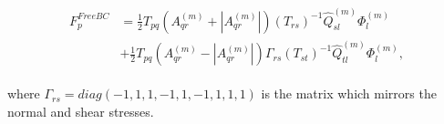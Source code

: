 \begin{align}
    \begin{split}
    F_{p}^{FreeBC} &= \frac{1}{2}T_{pq}\left(A_{qr}^{\left(m\right)} + \left|A_{qr}^{\left(m\right)}\right|\right) \left(T_{rs}\right)^{-1} \hat{Q}_{sl}^{\left(m\right)} \Phi_l^{\left(m\right)}
    \\ &+ \frac{1}{2} T_{pq} \left(A_{qr}^{\left(m\right)} - \left|A_{qr}^{\left(m\right)}\right|\right) \Gamma_{rs} \left(T_{st}\right)^{-1} \hat{Q}_{tl}^{\left(m\right)} \Phi_l^{\left(m\right)} ,
    \end{split}
\end{align}

where $\Gamma_{rs} = diag\left(-1,1,1,-1,1,-1,1,1,1\right)$ is the matrix which mirrors the normal and shear stresses.